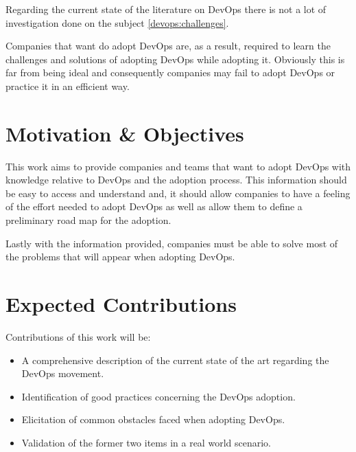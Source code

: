 		Regarding the current state of the literature on DevOps there is not a lot of investigation done on the subject \ref{devops:challenges}. 

		Companies that want do adopt DevOps are, as a result, required to learn the challenges and solutions of adopting DevOps while adopting it. Obviously this is far from being ideal and consequently companies may fail to adopt DevOps or practice it in an efficient way.

		   
	\section{Motivation \& Objectives} \label{chap:introduction:sec:motivation}

	    This work aims to provide companies and teams that want to adopt DevOps with knowledge relative to DevOps and the adoption process. This information should be easy to access and understand and, it should allow companies to have a feeling of the effort needed to adopt DevOps as well as allow them to define a preliminary road map for the adoption. 
	    
	    Lastly with the information provided, companies must be able to solve most of the problems that will appear when adopting DevOps.

    \section{Expected Contributions} \label{chap:introduction:sec:contributions}

    	Contributions of this work will be:
    	\begin{itemize}
    		\item{A comprehensive description of the current state of the art regarding the DevOps movement.}
    		\item{Identification of good practices concerning the DevOps adoption.}
    		\item{Elicitation of common obstacles faced when adopting DevOps.}
    		\item{Validation of the former two items in a real world scenario.}
    	\end{itemize}
